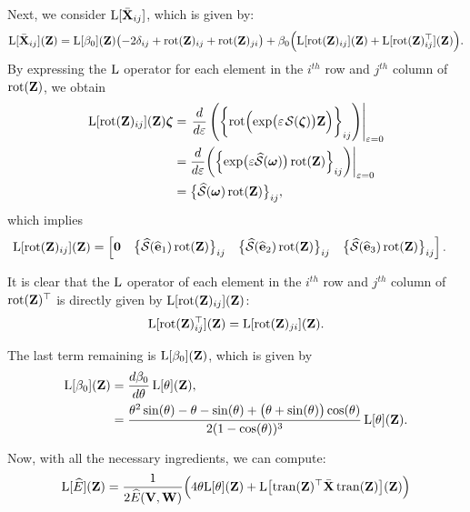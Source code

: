 Next, we consider $\operatorname{L}[\bar{\mathbf{X}}_{ij}]$, which is given by:
\begin{align}
    \operatorname{L}[\bar{\mathbf{X}}_{ij}](\mathbf{Z})= \operatorname{L}[\beta_0](\mathbf{Z})\bigl(-2\delta_{ij}+ \operatorname{rot}(\mathbf{Z})_{ij} + \operatorname{rot}(\mathbf{Z})_{ji}\bigr) + \beta_0\Bigl(\operatorname{L}[\operatorname{rot}(\mathbf{Z})_{ij}](\mathbf{Z}) + \operatorname{L}[\operatorname{rot}(\mathbf{Z})_{ij}^\top](\mathbf{Z})\Bigr).
\end{align}
By expressing the $\operatorname{L}$ operator for each element in the $i^{th}$ row and $j^{th}$ column of $\operatorname{rot}(\mathbf{Z})$, we obtain
\begin{align}
    \Lop[\rot(\mathbf{Z})_{ij}](\mathbf{Z})\boldsymbol{\zeta} &=  \left.\frac{d}{d\varepsilon}\left(\biggl\{\rot\Bigl(\exp\bigl(\varepsilon\SL[\boldsymbol{\zeta}]\bigr)\mathbf{Z}\Bigr)\biggr\}_{ij}\right)\right|_{\varepsilon=0}\\
    &=  \frac{d}{d\varepsilon}\biggl(\Bigl\{\exp\bigl(\varepsilon\widehat{\mathcal{S}}(\boldsymbol{\omega})\bigr)\rot(\mathbf{Z})\Bigr\}_{ij}\biggr)\biggr|_{\varepsilon=0}\\
    &=\bigl\{\widehat{\mathcal{S}}(\boldsymbol{\omega})\rot(\mathbf{Z})\bigr\}_{ij},
\end{align}
which implies
\begin{align}
    \operatorname{L}[\operatorname{rot}(\mathbf{Z})_{ij}](\mathbf{Z}) &= \begin{bmatrix}
        \mathbf{0} & \bigl\{\widehat{\mathcal{S}}(\widehat{\mathbf{e}}_1)\operatorname{rot}(\mathbf{Z})\bigr\}_{ij} & \bigl\{\widehat{\mathcal{S}}(\widehat{\mathbf{e}}_2)\operatorname{rot}(\mathbf{Z})\bigr\}_{ij} & \bigl\{\widehat{\mathcal{S}}(\widehat{\mathbf{e}}_3)\operatorname{rot}(\mathbf{Z})\bigr\}_{ij}
    \end{bmatrix}.
\end{align}

It is clear that the $\operatorname{L}$ operator of each element in the $i^{th}$ row and $j^{th}$ column of $\operatorname{rot}(\mathbf{Z})^\top$ is directly given by $\operatorname{L}[\operatorname{rot}(\mathbf{Z})_{ij}](\mathbf{Z})$:
\begin{align}
    \operatorname{L}[\operatorname{rot}(\mathbf{Z})^\top_{ij}](\mathbf{Z}) = \operatorname{L}[\operatorname{rot}(\mathbf{Z})_{ji}](\mathbf{Z}).
\end{align}

The last term remaining is $\operatorname{L}[\beta_0](\mathbf{Z})$, which is given by
\begin{align}
    \operatorname{L}[\beta_0](\mathbf{Z}) &= \frac{d\beta_0}{d\theta} \operatorname{L}[\theta](\mathbf{Z}),\\
    &= \frac{\theta^2\sin(\theta) - \theta - \sin(\theta) + \bigl(\theta + \sin(\theta)\bigr) \cos(\theta)}{2 (1 - \cos(\theta))^3} \operatorname{L}[\theta](\mathbf{Z}).
\end{align}

Now, with all the necessary ingredients, we can compute:
\begin{align}
    \operatorname{L}[\widehat{E}](\mathbf{Z}) = \frac{1}{2\widehat{E}(\mathbf{V}, \mathbf{W})} \Bigl(4\theta\text{L}[\theta](\mathbf{Z}) + \text{L}\bigl[\operatorname{tran}(\mathbf{Z})^\top\bar{\mathbf{X}}\operatorname{tran}(\mathbf{Z})\bigr](\mathbf{Z})\Bigr)
\end{align}